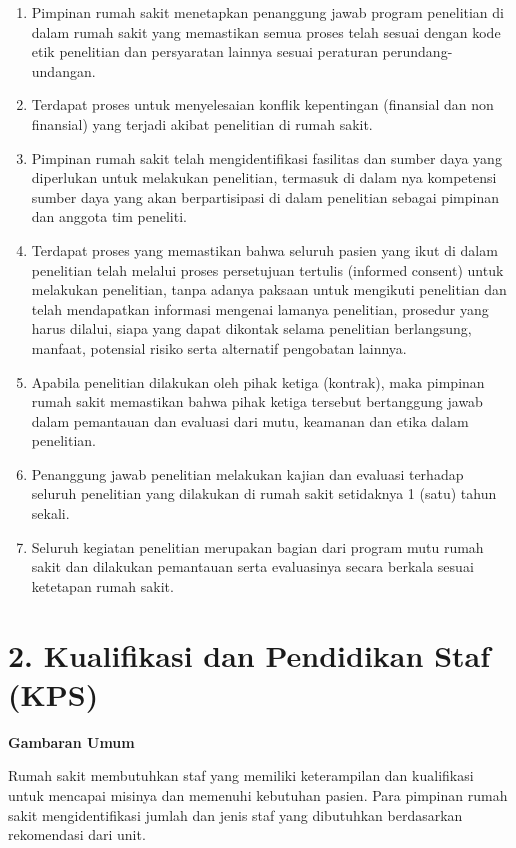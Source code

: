 \documentclass[
]{book}
\providecommand{\tightlist}{%
  \setlength{\itemsep}{0pt}\setlength{\parskip}{0pt}}
\begin{document}
\begin{enumerate}
\def\labelenumi{\alph{enumi}.}
\tightlist
\item
  Pimpinan rumah sakit menetapkan penanggung jawab program penelitian di dalam rumah sakit yang memastikan semua proses telah sesuai dengan kode etik penelitian dan persyaratan lainnya sesuai peraturan perundang-undangan.
\item
  Terdapat proses untuk menyelesaian konflik kepentingan (finansial dan non finansial) yang terjadi akibat penelitian di rumah sakit.
\item
  Pimpinan rumah sakit telah mengidentifikasi fasilitas dan sumber daya yang diperlukan untuk melakukan penelitian, termasuk di dalam nya kompetensi sumber daya yang akan berpartisipasi di dalam penelitian sebagai pimpinan dan anggota tim peneliti.
\item
  Terdapat proses yang memastikan bahwa seluruh pasien yang ikut di dalam penelitian telah melalui proses persetujuan tertulis (informed consent) untuk melakukan penelitian, tanpa adanya paksaan untuk mengikuti penelitian dan telah mendapatkan informasi mengenai lamanya penelitian, prosedur yang harus dilalui, siapa yang dapat dikontak selama penelitian berlangsung, manfaat, potensial risiko serta alternatif pengobatan lainnya.
\item
  Apabila penelitian dilakukan oleh pihak ketiga (kontrak), maka pimpinan rumah sakit memastikan bahwa pihak ketiga tersebut bertanggung jawab dalam pemantauan dan evaluasi dari mutu, keamanan dan etika dalam penelitian.
\item
  Penanggung jawab penelitian melakukan kajian dan evaluasi terhadap seluruh penelitian yang dilakukan di rumah sakit setidaknya 1 (satu) tahun sekali.
\item
  Seluruh kegiatan penelitian merupakan bagian dari program mutu rumah sakit dan dilakukan pemantauan serta evaluasinya secara berkala sesuai ketetapan rumah sakit.
\end{enumerate}

\hypertarget{kualifikasi-dan-pendidikan-staf-kps}{%
\section*{2. Kualifikasi dan Pendidikan Staf (KPS)}\label{kualifikasi-dan-pendidikan-staf-kps}}

\textbf{Gambaran Umum}

Rumah sakit membutuhkan staf yang memiliki keterampilan dan kualifikasi untuk mencapai misinya dan memenuhi kebutuhan pasien. Para pimpinan rumah sakit mengidentifikasi jumlah dan jenis staf yang dibutuhkan berdasarkan rekomendasi dari unit.
\end{document}
